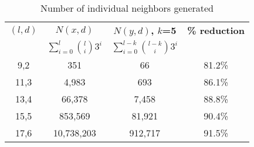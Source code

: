 \begin{table}[h] %
	\renewcommand{\arraystretch}{1.3}
	\caption{Number of individual neighbors generated}
	\label{tbl:neighbors_blockmasking}
	\centering
	\begin{tabular}{|c|c|c|c|}
	\hline 
	\bfseries\boldmath $(l,d)$ & \bfseries\boldmath $N(x,d)$ & \bfseries\boldmath $N(y,d)$, $k$=5 & \bfseries \% reduction\\
	\bfseries & \bfseries\boldmath $\sum_{i=0}^{l} \binom{l}{i} 3^{i}$ & \bfseries\boldmath $\sum_{i=0}^{l-k} \binom{l-k}{i} 3^{i}$ & \\
	\hline
	 9,2 &         351  &       66 & 81.2\%\\
	11,3 &       4,983  &      693 & 86.1\%\\
	13,4 &      66,378  &    7,458 & 88.8\%\\
	15,5 &     853,569  &   81,921 & 90.4\%\\
	17,6 &  10,738,203  &  912,717 & 91.5\%\\
	\hline\end{tabular}
\end{table}